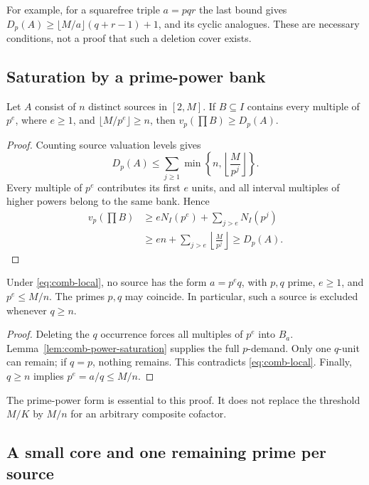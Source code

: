 For example, for a squarefree triple $a=pqr$ the last bound gives
$D_p(A)\ge\lfloor M/a\rfloor(q+r-1)+1$, and its cyclic analogues.
These are necessary conditions, not a proof that such a deletion
cover exists.

\subsection{Saturation by a prime-power bank}

\begin{lemma}
\label{lem:comb-power-saturation}
Let $A$ consist of $n$ distinct sources in $[2,M]$. If $B\subseteq I$
contains every multiple of $p^e$, where $e\ge1$, and
$\lfloor M/p^e\rfloor\ge n$, then $v_p(\prod B)\ge D_p(A)$.
\end{lemma}

\begin{proof}
Counting source valuation levels gives
\[
 D_p(A)\le\sum_{j\ge1}\min\left\{n,
                         \left\lfloor\frac M{p^j}\right\rfloor\right\}.
\]
Every multiple of $p^e$ contributes its first $e$ units, and all
interval multiples of higher powers belong to the same bank. Hence
\[
 \begin{split}
 v_p\!\left(\prod B\right)
 &\ge eN_I(p^e)+\sum_{j>e}N_I(p^j)\\
 &\ge en+\sum_{j>e}\left\lfloor\frac M{p^j}\right\rfloor
 \ge D_p(A).
 \end{split}
\]
\end{proof}

\begin{corollary}
\label{cor:comb-power-exclusion}
Under \eqref{eq:comb-local}, no source has the form
$a=p^e q$, with $p,q$ prime, $e\ge1$, and $p^e\le M/n$.
The primes $p,q$ may coincide. In particular, such a source is
excluded whenever $q\ge n$.
\end{corollary}

\begin{proof}
Deleting the $q$ occurrence forces all multiples of $p^e$ into
$B_a$. Lemma~\ref{lem:comb-power-saturation} supplies the full
$p$-demand. Only one $q$-unit can remain; if $q=p$, nothing remains.
This contradicts \eqref{eq:comb-local}. Finally,
$q\ge n$ implies $p^e=a/q\le M/n$.
\end{proof}

The prime-power form is essential to this proof. It does not replace
the threshold $M/K$ by $M/n$ for an arbitrary composite cofactor.

\subsection{A small core and one remaining prime per source}

